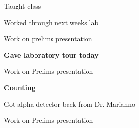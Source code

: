 \documentclass[idxtotoc,hyperref,openany,oneside]{labbook} %
\newcommand{\cmark}{\ding{51}}%
\newcommand{\done}{\rlap{$\square$}{\raisebox{2pt}{\large\hspace{1pt}\cmark}}%
  \hspace{-2.5pt}}
\begin{document}
\begin{todolist}
\item[\done]{Taught class}
\item[\done]{Worked through next weeks lab}
\end{todolist}

\begin{todolist}
\item{Work on prelims presentation}
\end{todolist}




\textbf{Gave laboratory tour today}

\begin{todolist}
\item{Work on Prelims presentation}
\end{todolist}



\textbf{Counting}
\begin{todolist}
\item[\done]{Got alpha detector back from Dr. Marianno}
\end{todolist}





\begin{todolist}
\item{Work on Prelims presentation}
\end{todolist}


\end{document}
